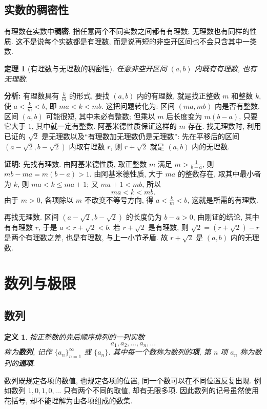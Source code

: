 \documentclass[UTF8,openany]{ctexbook}
\theoremstyle{chinesetextbook}
\newtheorem{definition}{定义}[section]
\newtheorem{theorem}{定理}[section]
\newenvironment{cnproof}{\par\indent\textbf{证明:} \ignorespaces}{\par}
\begin{document}
\subsection{实数的稠密性}
有理数在实数中\textbf{稠密}, 指任意两个不同实数之间都有有理数; 无理数也有同样的性质. 这不是说每个实数都是有理数, 而是说再短的非空开区间也不会只含其中一类数.
\begin{theorem}[有理数与无理数的稠密性]
任意非空开区间 $(a,b)$ 内既有有理数, 也有无理数.
\end{theorem}
\par\indent\textbf{分析:} 有理数具有 $\displaystyle\frac km$ 的形式, 要找 $(a,b)$ 内的有理数, 就是找正整数 $m$ 和整数 $k$, 使 $\displaystyle a<\frac km<b$, 即 $ma<k<mb$. 这把问题转化为: 区间 $(ma,mb)$ 内是否有整数. 区间 $(a,b)$ 可能很短, 其中未必有整数; 但乘以 $m$ 后长度变为 $m(b-a)$, 只要它大于 $1$, 其中就一定有整数. 阿基米德性质保证这样的 $m$ 存在. 找无理数时, 利用已证的 $\sqrt2$ 是无理数以及“有理数加无理数仍是无理数”: 先在平移后的区间 $(a-\sqrt2,b-\sqrt2)$ 内取有理数 $r$, 则 $r+\sqrt2$ 就是 $(a,b)$ 内的无理数.
\begin{cnproof}
先找有理数. 由阿基米德性质, 取正整数 $m$ 满足 $\displaystyle m>\frac1{b-a}$, 则 $mb-ma=m(b-a)>1$. 由阿基米德性质, 大于 $ma$ 的整数存在, 取其中最小者为 $k$, 则 $ma<k\le ma+1$; 又 $ma+1<mb$, 所以
\[
ma<k<mb.
\]
由于 $m>0$, 各项除以 $m$ 不改变不等号方向, 得 $\displaystyle a<\frac km<b$, 这就是所需的有理数.

再找无理数. 区间 $(a-\sqrt2,b-\sqrt2)$ 的长度仍为 $b-a>0$, 由刚证的结论, 其中有有理数 $r$, 于是 $a<r+\sqrt2<b$. 若 $r+\sqrt2$ 是有理数, 则 $\sqrt2=(r+\sqrt2)-r$ 是两个有理数之差, 也是有理数, 与上一小节矛盾. 故 $r+\sqrt2$ 是 $(a,b)$ 内的无理数.
\end{cnproof}
\section{数列与极限}

\subsection{数列}

\begin{definition}
按正整数的先后顺序排列的一列实数
\[
a_1,a_2,\ldots,a_n,\ldots
\]
称为\textbf{数列}, 记作 $\{a_n\}_{n=1}^{\infty}$ 或 $\{a_n\}$. 其中每一个数称为数列的\textbf{项}, 第 $n$ 项 $a_n$ 称为数列的\textbf{通项}.
\end{definition}

数列既规定各项的数值, 也规定各项的位置, 同一个数可以在不同位置反复出现. 例如数列 $1,0,1,0,\ldots$ 只有两个不同的取值, 却有无限多项. 因此数列的记号虽然使用花括号, 却不能理解为由各项组成的数集.
\end{document}

